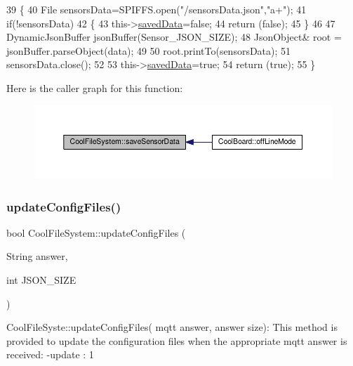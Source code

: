 \begin{DoxyCode}
39 \{
40     File sensorsData=SPIFFS.open(\textcolor{stringliteral}{"/sensorsData.json"},\textcolor{stringliteral}{"a+"});
41     \textcolor{keywordflow}{if}(!sensorsData)
42     \{
43         this->\hyperlink{classCoolFileSystem_ad398e0c5c41a0c88acdf5d672aa71351}{savedData}=\textcolor{keyword}{false};
44         \textcolor{keywordflow}{return} (\textcolor{keyword}{false}); 
45     \}   
46 
47     DynamicJsonBuffer jsonBuffer(Sensor\_JSON\_SIZE);
48     JsonObject& root = jsonBuffer.parseObject(data);
49     
50     root.printTo(sensorsData);
51     sensorsData.close();
52     
53     this->\hyperlink{classCoolFileSystem_ad398e0c5c41a0c88acdf5d672aa71351}{savedData}=\textcolor{keyword}{true};
54     \textcolor{keywordflow}{return} (\textcolor{keyword}{true});      
55 \}
\end{DoxyCode}
Here is the caller graph for this function\+:
\nopagebreak
\begin{figure}[H]
\begin{center}
\leavevmode
\includegraphics[width=350pt]{classCoolFileSystem_a4c560c2ddd40b74b7758e6ceb2c58957_icgraph}
\end{center}
\end{figure}
\mbox{\label{classCoolFileSystem_a32dad79ae80182a83e2e8f52286b7c7b}} 
\subsubsection{\texorpdfstring{update\+Config\+Files()}{updateConfigFiles()}}
{\footnotesize\ttfamily bool Cool\+File\+System\+::update\+Config\+Files (\begin{DoxyParamCaption}\item[{String}]{answer,  }\item[{int}]{J\+S\+O\+N\+\_\+\+S\+I\+ZE }\end{DoxyParamCaption})}

Cool\+File\+Syste\+::update\+Config\+Files( mqtt answer, answer size)\+: This method is provided to update the configuration files when the appropriate mqtt answer is received\+: -\/update \+: 1


